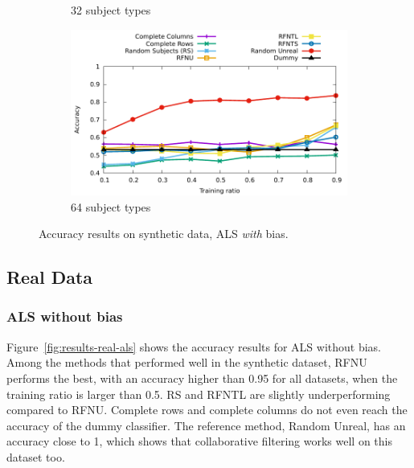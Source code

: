 \documentclass[10pt, conference, compsocconf]{IEEEtran}
\begin{document}
\begin{figure}
\begin{subfigure}[b]{\columnwidth}
        \caption{32 subject types}
\end{subfigure}
\hfill
\begin{subfigure}[b]{\columnwidth}
        \includegraphics[width=0.8\columnwidth]{data/results/means_of_results/ALS-Bias/Synthetic/synthetic_subject_types/ALS-Bias-64-types.pdf}
        \caption{64 subject types}
\end{subfigure}
\caption{Accuracy results on synthetic data, ALS \emph{with} bias.}
\label{fig:results-synthetic-als-bias}
\end{figure}

\subsection{Real Data}

\subsubsection{ALS without bias}

Figure~\ref{fig:results-real-als} shows the accuracy results for ALS without bias. Among the methods that performed 
well in the synthetic dataset, RFNU performs the best, with an accuracy 
higher than 0.95 for all datasets, when the training ratio is larger 
than 0.5. RS and RFNTL are slightly underperforming compared to RFNU. 
Complete rows and complete columns do not even reach the accuracy of 
the dummy classifier. The reference method, Random Unreal, has an 
accuracy close to 1, which shows that collaborative filtering works 
well on this dataset too.
\end{document}
